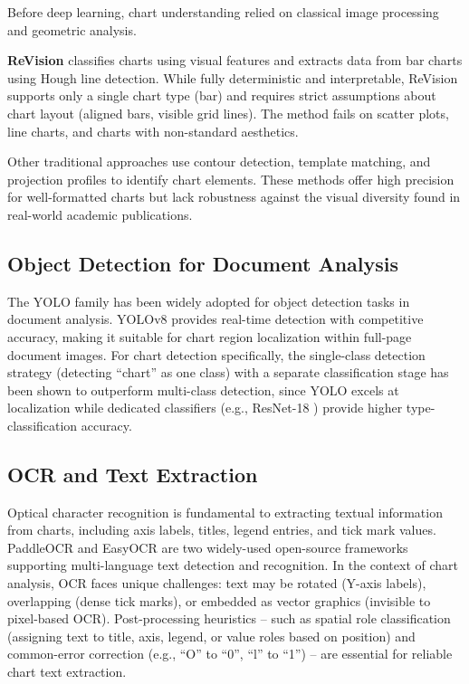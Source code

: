 Before deep learning, chart understanding relied on classical image processing and
geometric analysis.

\textbf{ReVision} \cite{savva2011revision} classifies charts using visual features and
extracts data from bar charts using Hough line detection. While fully deterministic and
interpretable, ReVision supports only a single chart type (bar) and requires strict
assumptions about chart layout (aligned bars, visible grid lines). The method fails
on scatter plots, line charts, and charts with non-standard aesthetics.

Other traditional approaches use contour detection, template matching, and projection
profiles to identify chart elements. These methods offer high precision for well-formatted
charts but lack robustness against the visual diversity found in real-world academic
publications.

\subsection{Object Detection for Document Analysis}

The YOLO family \cite{redmon2016yolo, jocher2023yolov8} has been widely adopted for
object detection tasks in document analysis. YOLOv8 provides real-time detection with
competitive accuracy, making it suitable for chart region localization within full-page
document images. For chart detection specifically, the single-class detection strategy
(detecting ``chart'' as one class) with a separate classification stage has been shown
to outperform multi-class detection, since YOLO excels at localization while dedicated
classifiers (e.g., ResNet-18 \cite{he2016resnet}) provide higher type-classification
accuracy.

\subsection{OCR and Text Extraction}

Optical character recognition is fundamental to extracting textual information from charts,
including axis labels, titles, legend entries, and tick mark values. PaddleOCR
\cite{du2020paddleocr} and EasyOCR \cite{jaided2020easyocr} are two widely-used
open-source frameworks supporting multi-language text detection and recognition.
In the context of chart analysis, OCR faces unique challenges: text may be rotated
(Y-axis labels), overlapping (dense tick marks), or embedded as vector graphics
(invisible to pixel-based OCR). Post-processing heuristics -- such as spatial role
classification (assigning text to title, axis, legend, or value roles based on position)
and common-error correction (e.g., ``O'' to ``0'', ``l'' to ``1'') -- are essential
for reliable chart text extraction.

